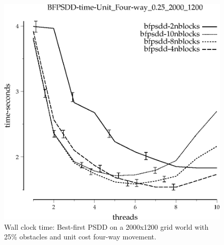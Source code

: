 \documentclass{article}
\begin{document}
\begin{figure}[t]
\begin{center}
\includegraphics{grid_unit_four-way_0.25_2000_1200/BFPSDD-time-Unit_Four-way_0.25_2000_1200.eps}
\caption{Wall clock time: Best-first PSDD on a 2000x1200 grid world with 25\%
  obstacles and unit cost four-way movement.}
\end{center}
\end{figure}
\end{document}
